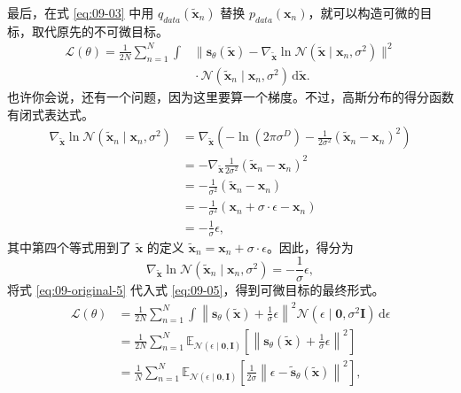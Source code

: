 最后，在式 \eqref{eq:09-03} 中用 $q_{\mathit{data}}(\tilde{\mathbf x}_n)$ 替换 $p_{\mathit{data}}(\mathbf x_n)$，就可以构造可微的目标，取代原先的不可微目标。
\begin{equation}
  \begin{aligned}
    \mathcal L(\theta)=\frac{1}{2N}\sum_{n=1}^{N}\int
    &\bigl\lVert\mathbf s_\theta(\tilde{\mathbf x})
        -\nabla_{\tilde{\mathbf x}}\ln\mathcal N(\tilde{\mathbf x}\mid\mathbf x_n,\sigma^2)
      \bigr\rVert^2\\[-2pt]
    &{}\cdot\mathcal N(\tilde{\mathbf x}_n\mid\mathbf x_n,\sigma^2)\,\mathrm d\tilde{\mathbf x}.
  \end{aligned}
  \tag{9.5}\label{eq:09-05}
\end{equation}
也许你会说，还有一个问题，因为这里要算一个梯度。不过，高斯分布的得分函数有闭式表达式。
\begin{align}
  \nabla_{\tilde{\mathbf x}}\ln\mathcal N(\tilde{\mathbf x}_n\mid\mathbf x_n,\sigma^2)
    &=\nabla_{\tilde{\mathbf x}}
      \left(-\ln(2\pi\sigma^D)-\frac{1}{2\sigma^2}(\tilde{\mathbf x}_n-\mathbf x_n)^2\right)
      \tag{9.6}\label{eq:09-06}\\
    &=-\nabla_{\tilde{\mathbf x}}\frac{1}{2\sigma^2}(\tilde{\mathbf x}_n-\mathbf x_n)^2
      \tag{9.7}\label{eq:09-07}\\
    &=-\frac{1}{\sigma^2}(\tilde{\mathbf x}_n-\mathbf x_n)
      \tag{9.8}\label{eq:09-08}\\
    &=-\frac{1}{\sigma^2}(\mathbf x_n+\sigma\cdot\epsilon-\mathbf x_n)
      \tag{9.9}\label{eq:09-09}\\
    &=-\frac{1}{\sigma}\epsilon,
      \tag{9.10}\label{eq:09-10}
\end{align}
其中第四个等式用到了 $\tilde{\mathbf x}$ 的定义 $\tilde{\mathbf x}_n=\mathbf x_n+\sigma\cdot\epsilon$。因此，得分为
\begin{equation}
  \nabla_{\tilde{\mathbf x}}\ln\mathcal N(\tilde{\mathbf x}_n\mid\mathbf x_n,\sigma^2)
  =-\frac{1}{\sigma}\epsilon,
  \tag{5}\label{eq:09-original-5}
\end{equation}
将式 \eqref{eq:09-original-5} 代入式 \eqref{eq:09-05}，得到可微目标的最终形式。
\begin{align}
  \mathcal L(\theta)
    &=\frac{1}{2N}\sum_{n=1}^{N}\int
      \left\lVert\mathbf s_\theta(\tilde{\mathbf x})+\frac{1}{\sigma}\epsilon\right\rVert^2
      \mathcal N(\epsilon\mid\mathbf 0,\sigma^2\mathbf I)\,\mathrm d\epsilon
      \tag{9.11}\label{eq:09-11}\\
    &=\frac{1}{2N}\sum_{n=1}^{N}\mathbb E_{\mathcal N(\epsilon\mid\mathbf 0,\mathbf I)}
      \left[\left\lVert\mathbf s_\theta(\tilde{\mathbf x})+\frac{1}{\sigma}\epsilon\right\rVert^2\right]
      \tag{9.12}\label{eq:09-12}\\
    &=\frac{1}{N}\sum_{n=1}^{N}\mathbb E_{\mathcal N(\epsilon\mid\mathbf 0,\mathbf I)}
      \left[\frac{1}{2\sigma}\left\lVert\epsilon-\tilde{\mathbf s}_\theta(\tilde{\mathbf x})\right\rVert^2\right],
      \tag{9.13}\label{eq:09-13}
\end{align}
